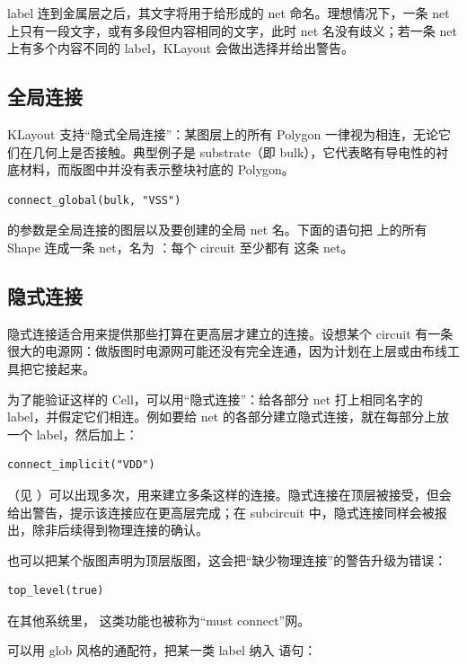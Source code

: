 label 连到金属层之后，其文字将用于给形成的 net 命名。理想情况下，一条 net 上只有一段文字，或有多段但内容相同的文字，此时 net 名没有歧义；若一条 net 上有多个内容不同的 label，KLayout 会做出选择并给出警告。

\subsection{全局连接}

KLayout 支持“隐式全局连接”：某图层上的所有 Polygon 一律视为相连，无论它们在几何上是否接触。典型例子是 substrate（即 bulk），它代表略有导电性的衬底材料，而版图中并没有表示整块衬底的 Polygon。

\begin{lstlisting}
connect_global(bulk, "VSS")
\end{lstlisting}

 的参数是全局连接的图层以及要创建的全局 net 名。下面的语句把  上的所有 Shape 连成一条 net，名为 ：每个 circuit 至少都有  这条 net。

\subsection{隐式连接}

隐式连接适合用来提供那些打算在更高层才建立的连接。设想某个 circuit 有一条很大的电源网：做版图时电源网可能还没有完全连通，因为计划在上层或由布线工具把它接起来。

为了能验证这样的 Cell，可以用“隐式连接”：给各部分 net 打上相同名字的 label，并假定它们相连。例如要给  net 的各部分建立隐式连接，就在每部分上放一个  label，然后加上：

\begin{lstlisting}
connect_implicit("VDD")
\end{lstlisting}

（见 ）可以出现多次，用来建立多条这样的连接。隐式连接在顶层被接受，但会给出警告，提示该连接应在更高层完成；在 subcircuit 中，隐式连接同样会被报出，除非后续得到物理连接的确认。

也可以把某个版图声明为顶层版图，这会把“缺少物理连接”的警告升级为错误：

\begin{lstlisting}
top_level(true)
\end{lstlisting}

在其他系统里， 这类功能也被称为“must connect”网。

可以用 glob 风格的通配符，把某一类 label 纳入  语句：

